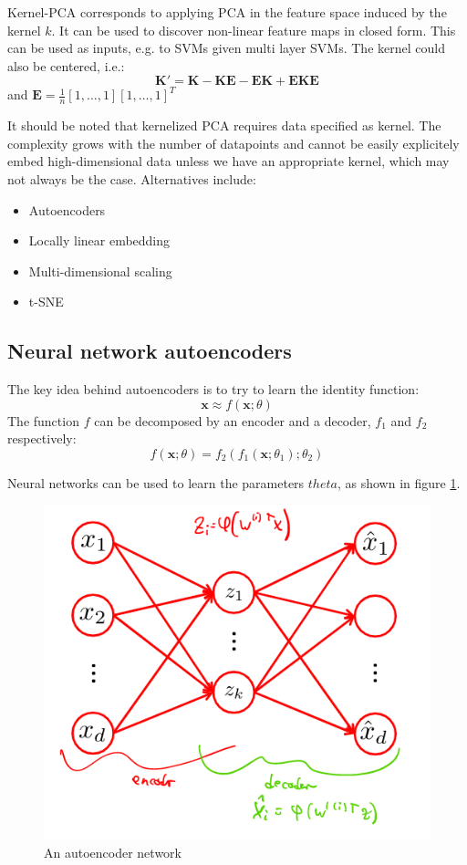 \documentclass[a4paper,10pt,twoside]{article}
\begin{document}
Kernel-PCA corresponds to applying PCA in the feature space induced by the kernel $k$. It can be used to discover non-linear feature maps in closed form. This can be used as inputs, e.g. to SVMs given multi layer SVMs. The kernel could also be centered, i.e.:
\begin{equation*}
    \mathbf{K}'=\mathbf{K}-\mathbf{KE}-\mathbf{EK}+\mathbf{EKE}
\end{equation*}
and $\mathbf{E}=\frac{1}{n}[1,\ldots, 1][1,\ldots, 1]^T$

It should be noted that kernelized PCA requires data specified as kernel. The complexity grows with the number of datapoints and cannot be easily explicitely embed high-dimensional data unless we have an appropriate kernel, which may not always be the case. Alternatives include:
\begin{itemize}
    \item Autoencoders
    \item Locally linear embedding
    \item Multi-dimensional scaling
    \item t-SNE
\end{itemize}

\subsection{Neural network autoencoders}

The key idea behind autoencoders is to try to learn the identity function:
\begin{equation*}
    \mathbf{x}\approx f(\mathbf{x};\theta)
\end{equation*}
The function $f$ can be decomposed by an encoder and a decoder, $f_1$ and $f_2$ respectively:
\begin{equation*}
    f(\mathbf{x};\theta) = f_2(f_1(\mathbf{x};\theta_1);\theta_2)
\end{equation*}

Neural networks can be used to learn the parameters $theta$, as shown in figure \ref{autoencoder_network}.

\begin{figure}
    \centering
    \includegraphics[width=.5\textwidth]{figures/autoencoder_network.png}
    \caption{An autoencoder network}
    \label{autoencoder_network}
\end{figure}
\end{document}
